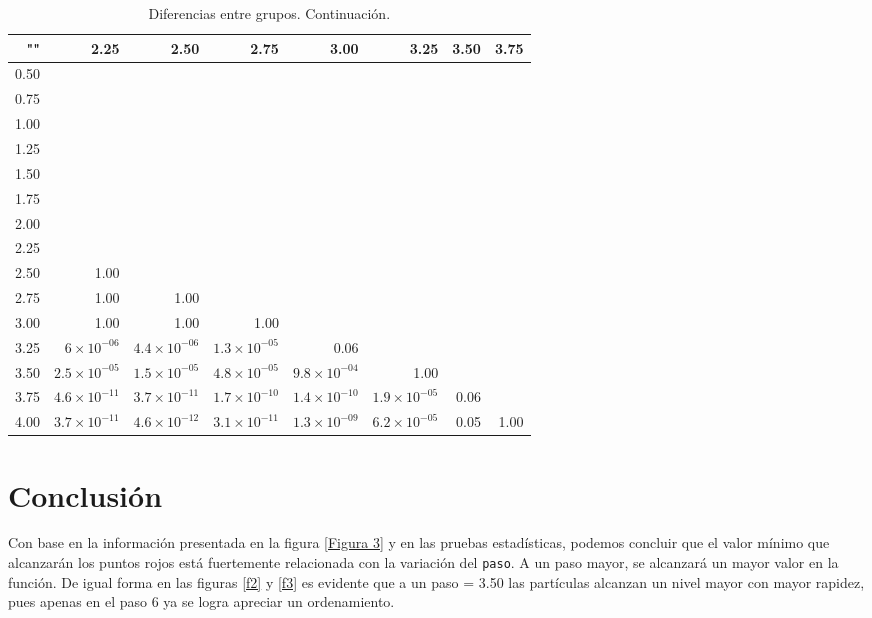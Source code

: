 \documentclass{article}
\begin{document}
\begin{table}[htb]
    \centering
    \caption{Diferencias entre grupos. Continuaci\'on.} 
    \begin{tabular}{|r|r|r|r|r|r|r|r|}
    \hline
    "" & 2.25 & 2.50 & 2.75 & 3.00 & 3.25 & 3.50 & 3.75 \\
    \hline
    0.50 &  &  &  &  &  &  &  \\
    \hline
    0.75 &  &  &  &  &  &  &  \\
    \hline
    1.00 &  &  &  &  &  &  &  \\
    \hline
    1.25 &  &  &  &  &  &  &  \\
    \hline
    1.50 &  &  &  &  &  &  &  \\
    \hline
    1.75 &  &  &  &  &  &  &  \\
    \hline
    2.00 &  &  &  &  &  &  &  \\
    \hline
    2.25 &   &  &  &  &  &  &  \\
    \hline
    2.50 & 1.00 &  &  &  &  &  &  \\
    \hline
    2.75 & 1.00 & 1.00 &  &  &  &  &  \\
    \hline
    3.00 & 1.00 & 1.00 & 1.00 &  &  &  &  \\
    \hline
    3.25 & $6\times 10^{-06}$ & $4.4\times 10^{-06}$ & $1.3\times 10^{-05}$ & 0.06 &  &  &  \\
    \hline
    3.50 & $2.5\times 10^{-05}$ & $1.5\times 10^{-05}$ & $4.8\times 10^{-05}$ & $9.8\times 10^{-04}$ & 1.00 &  &  \\
    \hline
    3.75 & $4.6\times 10^{-11}$ & $3.7\times 10^{-11}$ & $1.7\times 10^{-10}$ & $1.4\times 10^{-10}$ & $1.9\times 10^{-05}$ & 0.06 &  \\
    \hline
    4.00 & $3.7\times 10^{-11}$ & $4.6\times 10^{-12}$ & $3.1\times 10^{-11}$ & $1.3\times 10^{-09}$ & $6.2\times 10^{-05}$ & 0.05 & 1.00 \\
    \hline
\end{tabular}
    \label{cuadro 5}
\end{table}



\clearpage \section{Conclusi\'on}
Con base en la informaci\'on presentada en la figura \ref{Figura 3} y en las pruebas estad\'isticas, podemos concluir que el valor m\'inimo que alcanzar\'an los puntos rojos est\'a fuertemente relacionada con la variaci\'on del \texttt{paso}. A un paso mayor, se alcanzar\'a un mayor valor en la funci\'on.\newline
De igual forma en las figuras \ref{f2} y \ref{f3} es evidente que a un paso = 3.50 las part\'iculas alcanzan un nivel mayor con mayor rapidez, pues apenas en el paso 6 ya se logra apreciar un ordenamiento.




\end{document}
